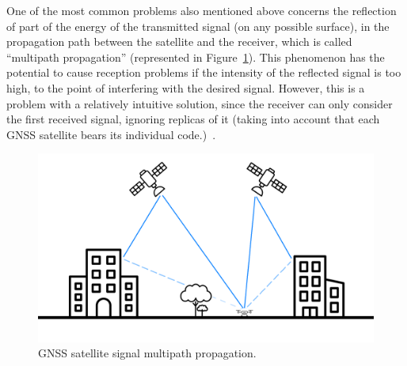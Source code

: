 One of the most common problems also mentioned above concerns the reflection of part of the energy of the transmitted signal (on any possible surface), in the propagation path between the satellite and the receiver, which is called ``multipath propagation'' (represented in Figure~\ref{fig:multipath}). This phenomenon has the potential to cause reception problems if the intensity of the reflected signal is too high, to the point of interfering with the desired signal. However, this is a problem with a relatively intuitive solution, since the receiver can only consider the first received signal, ignoring replicas of it (taking into account that each GNSS satellite bears its individual code.)~\cite{novatel_gnss,kaplan_2017}.

\begin{figure}[ht]
	\centering
	\includegraphics[width=1.0\textwidth]{Chapters/Figures/multipath.png}
	\caption{GNSS satellite signal multipath propagation.}
	\label{fig:multipath}
\end{figure}


